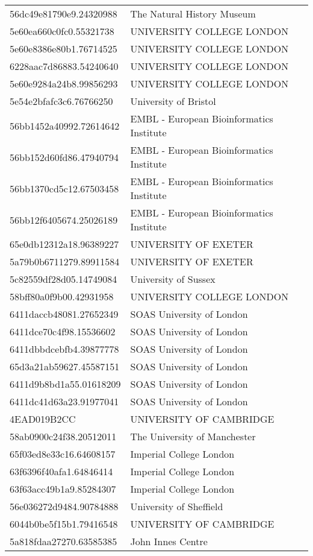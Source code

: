 \begin{tabular}{ll}
56dc49e81790e9.24320988 & The Natural History Museum \\
5e60ea660c0fc0.55321738 & UNIVERSITY COLLEGE LONDON \\
5e60e8386e80b1.76714525 & UNIVERSITY COLLEGE LONDON \\
6228aac7d86883.54240640 & UNIVERSITY COLLEGE LONDON \\
5e60e9284a24b8.99856293 & UNIVERSITY COLLEGE LONDON \\
5e54e2bfafc3c6.76766250 & University of Bristol \\
56bb1452a40992.72614642 & EMBL - European Bioinformatics Institute \\
56bb152d60fd86.47940794 & EMBL - European Bioinformatics Institute \\
56bb1370cd5c12.67503458 & EMBL - European Bioinformatics Institute \\
56bb12f6405674.25026189 & EMBL - European Bioinformatics Institute \\
65e0db12312a18.96389227 & UNIVERSITY OF EXETER \\
5a79b0b6711279.89911584 & UNIVERSITY OF EXETER \\
5c82559df28d05.14749084 & University of Sussex \\
58bff80a0f9b00.42931958 & UNIVERSITY COLLEGE LONDON \\
6411daccb48081.27652349 & SOAS University of London \\
6411dce70c4f98.15536602 & SOAS University of London \\
6411dbbdcebfb4.39877778 & SOAS University of London \\
65d3a21ab59627.45587151 & SOAS University of London \\
6411d9b8bd1a55.01618209 & SOAS University of London \\
6411dc41d63a23.91977041 & SOAS University of London \\
4EAD019B2CC & UNIVERSITY OF CAMBRIDGE \\
58ab0900c24f38.20512011 & The University of Manchester \\
65f03ed8e33c16.64608157 & Imperial College London \\
63f6396f40afa1.64846414 & Imperial College London \\
63f63acc49b1a9.85284307 & Imperial College London \\
56e036272d9484.90784888 & University of Sheffield \\
6044b0be5f15b1.79416548 & UNIVERSITY OF CAMBRIDGE \\
5a818fdaa27270.63585385 & John Innes Centre \\

\end{tabular}

